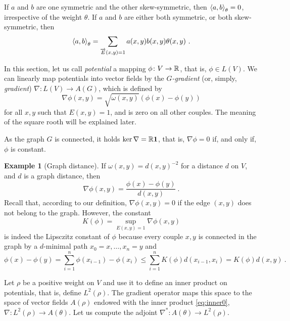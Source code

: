 \documentclass[12pt,a4paper]{amsart}
\theoremstyle{definition}
\newtheorem{example}{Example}
\begin{document}
If $a$ and $b$ are one symmetric and the other skew-symmetric, then
$\left\langle a,b\right\rangle_{\theta} = 0$, irrespective of the weight $\theta$.
If $a$ and $b$ are either both symmetric, or both skew-symmetric, then
\begin{equation}\label{eq:inner0}
  \left\langle a,b\right\rangle_{\theta} = \sum_{\overrightarrow E(x,y)=1}
  a(x,y)b(x,y) \theta(x,y) \ .
\end{equation}

In this section, let us call \emph{potential} a mapping
$\phi \colon V \to \mathbb{R}$, that is, $\phi\in L(V)$. We can linearly
map potentials into vector fields by the \emph{$G$-gradient} (or,
simply, \emph{gradient}) $\nabla \colon L(V) \to A(G)$, which is
defined by
\begin{equation}\label{eq:nabla}
  \nabla \phi(x,y) = \sqrt {\omega(x,y)} (\phi(x) - \phi(y))
\end{equation}
for all $x,y$ such that $E(x,y)=1$, and is zero on all other
couples. The meaning of the square rooth will be explained later.

As the graph $G$ is connected, it holds $\ker \nabla = \mathbb{R} \bm 1$,
that is, $\nabla\phi=0$ if, and only if, $\phi$ is constant.

\begin{example}[Graph distance] If $\omega(x,y) = d(x,y)^{-2}$ for a distance $d$ on
$V$, and $d$ is a graph distance, then
\begin{equation*}
  \nabla \phi (x,y)=\frac{\phi(x) - \phi(y)}{d(x,y)} \ .
\end{equation*}
Recall that, according to our definition, $\nabla \phi (x,y) = 0$ if
the edge $(x,y)$ does not belong to the graph. However, the constant
\begin{equation*}
  K(\phi) = \sup_{E(x,y)=1} \nabla \phi(x,y)
\end{equation*}
is indeed the Lipsczitz constant of $\phi$ because every couple $x,y$
is connected in the graph by a $d$-minimal path $x_0=x, \dots, x_n=y$
and
\begin{equation*}
  \phi(x) - \phi(y) = \sum_{i=1}^n \phi(x_{i-1}) - \phi(x_i) \leq
  \sum_{i=1}^n K(\phi) d(x_{i-1},x_i) = K(\phi) d(x,y) \ . 
\end{equation*}
\end{example}

Let $\rho$ be a positive weight on $V$ and use it to define an inner
product on potentials, that is, define $L^2(\rho)$. The gradient
operator maps this space to the space of vector fields $A(\rho)$
endowed with the inner product \eqref{eq:inner0},
$\nabla \colon L^2(\rho) \to A(\theta)$.  Let us compute the adjoint
$\nabla^* \colon A(\theta) \to L^2(\rho)$.
\end{document}
